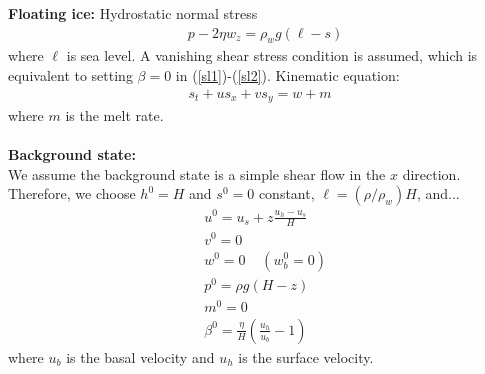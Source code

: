 \documentclass[paper=a4, fontsize=11pt]{article}
\begin{document}
\textbf{Floating ice:}
Hydrostatic normal stress
\begin{align}
&p-2\eta w_z  = \rho_w g(\ell-s)
\end{align}
where $\ell$ is sea level. A vanishing shear stress condition is assumed,
which is equivalent to setting $\beta=0$ in (\ref{sl1})-(\ref{sl2}).
\noindent Kinematic equation:
\begin{align}
s_t + us_x + vs_y  = w + m
\end{align}
where $m$ is the melt rate.\\ \\
\noindent\textbf{Background state:}\\
We assume the background state is a simple shear flow in the $x$ direction.
Therefore, we choose $h^0=H$ and $s^0=0$ constant, $\ell=(\rho/\rho_w)H$, and...
\begin{align}
&u^0 = u_s + z\frac{u_h-u_s}{H}  \\
& v^0 = 0 \\
&w^0 = 0 \;\;\;\; (w_b^0=0)\\
&p^0 = \rho g (H-z) \\
& m^0 = 0\\
&\beta^0  = \frac{\eta}{H}\left(\frac{u_h}{u_b} -1\right)
\end{align}
where $u_b$ is the basal velocity and $u_h$ is the surface velocity.\\
\end{document}
